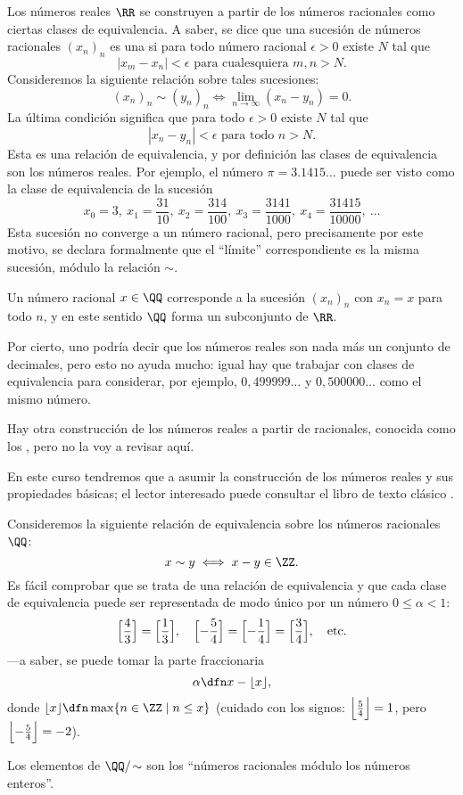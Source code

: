 \begin{ejemplo}
  Los números reales $\RR$ se construyen a partir de los números racionales como
  ciertas clases de equivalencia. A saber, se dice que una sucesión de números
  racionales $(x_n)_n$ es una  si para todo número
  racional $\epsilon > 0$ existe $N$ tal que
  $$|x_m - x_n| < \epsilon \text{ para cualesquiera }m,n > N.$$
  Consideremos la siguiente relación sobre tales sucesiones:
  $$(x_n)_n \sim (y_n)_n \iff \lim_{n\to\infty} (x_n-y_n) = 0.$$ 
  La última condición significa que para todo $\epsilon > 0$ existe $N$ tal que
  $$|x_n - y_n| < \epsilon \text{ para todo }n > N.$$
  Esta es una relación de equivalencia, y por definición las clases de
  equivalencia son los números reales. Por ejemplo, el número
  $\pi = 3.1415\ldots$ puede ser visto como la clase de equivalencia de la
  sucesión
  \[ x_0 = 3, ~
    x_1 = \frac{31}{10}, ~
    x_2 = \frac{314}{100}, ~
    x_3 = \frac{3141}{1000}, ~
    x_4 = \frac{31415}{10000}, ~
    \ldots \]
  Esta sucesión no converge a un número racional, pero precisamente por este
  motivo, se declara formalmente que el ``límite'' correspondiente es la misma
  sucesión, módulo la relación $\sim$.

  Un número racional $x\in \QQ$ corresponde a la sucesión $(x_n)_n$ con
  $x_n = x$ para todo $n$, y en este sentido $\QQ$ forma un subconjunto de
  $\RR$.

  Por cierto, uno podría decir que los números reales son nada más un conjunto
  de decimales, pero esto no ayuda mucho: igual hay que trabajar con clases de
  equivalencia para considerar, por ejemplo, $0,499999\ldots$ y $0,500000\ldots$
  como el mismo número.

  Hay otra construcción de los números reales a partir de racionales, conocida
  como los , pero no la voy a revisar aquí.

  En este curso tendremos que a asumir la construcción de los números reales y
  sus propiedades básicas; el lector interesado puede consultar el libro de
  texto clásico \cite{Rudin-principles}.
\end{ejemplo}

\begin{ejemplo}
  \label{ejemplo:parte-fraccionaria}
  Consideremos la siguiente relación de equivalencia sobre los números
  racionales $\QQ$:
  $$x\sim y \iff x-y \in \ZZ.$$
  Es fácil comprobar que se trata de una relación de equivalencia y que cada
  clase de equivalencia puede ser representada de modo único por un número
  $0 \le \alpha < 1$:
  \[ \Bigl[\frac{4}{3}\Bigr] = \Bigl[\frac{1}{3}\Bigr], \quad
    \Bigl[-\frac{5}{4}\Bigr] = \Bigl[-\frac{1}{4}\Bigr] = \Bigl[\frac{3}{4}\Bigr], \quad
    \text{etc.} \]
  ---a saber, se puede tomar la parte fraccionaria
  $$\alpha \dfn x - \lfloor x\rfloor,$$
  donde $\lfloor x\rfloor \dfn \max \{ n \in \ZZ \mid n \le x \}$ (cuidado con
  los signos: $\Bigl\lfloor\frac{5}{4}\Bigr\rfloor = 1$, pero
  $\Bigl\lfloor-\frac{5}{4}\Bigr\rfloor = -2$).

  Los elementos de $\QQ/\!\sim$ son los ``números racionales módulo los números
  enteros''.
\end{ejemplo}

